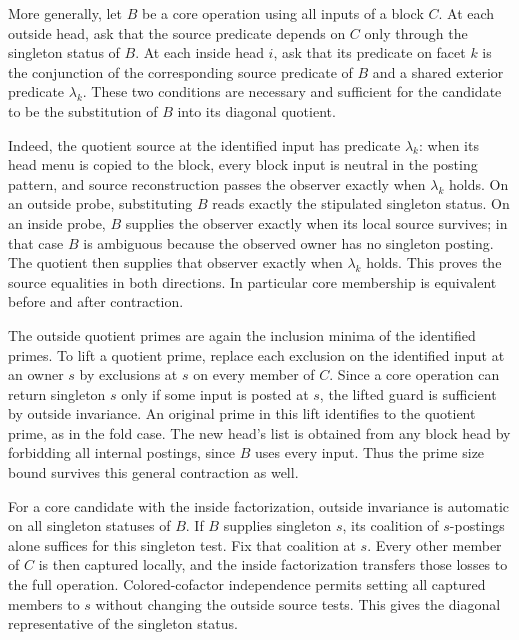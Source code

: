 More generally, let $B$ be a core operation using
all inputs of a block $C$. At each outside head, ask
that the source predicate depends on $C$ only through
the singleton status of $B$. At each inside head
$i$, ask that its predicate on facet $k$ is the
conjunction of the corresponding source predicate
of $B$ and a shared exterior predicate $\lambda_k$.
These two conditions are necessary and sufficient
for the candidate to be the substitution of $B$ into
its diagonal quotient.

Indeed, the quotient source at the identified input
has predicate $\lambda_k$: when its head menu is
copied to the block, every block input is neutral
in the posting pattern, and source reconstruction
passes the observer exactly when $\lambda_k$ holds.
On an outside probe, substituting $B$ reads exactly
the stipulated singleton status. On an inside probe,
$B$ supplies the observer exactly when its local
source survives; in that case $B$ is ambiguous
because the observed owner has no singleton
posting. The quotient then supplies that observer
exactly when $\lambda_k$ holds. This proves the
source equalities in both directions. In particular
core membership is equivalent before and after
contraction.

The outside quotient primes are again the inclusion
minima of the identified primes. To lift a quotient
prime, replace each exclusion on the identified input
at an owner $s$ by exclusions at $s$ on every member
of $C$. Since a core operation can return singleton
$s$ only if some input is posted at $s$, the lifted
guard is sufficient by outside invariance. An original
prime in this lift identifies to the quotient prime,
as in the fold case. The new head's list is obtained
from any block head by forbidding all internal
postings, since $B$ uses every input. Thus the prime
size bound survives this general contraction as well.

For a core candidate with the inside factorization,
outside invariance is automatic on all singleton
statuses of $B$. If $B$ supplies singleton $s$,
its coalition of $s$-postings alone suffices for
this singleton test. Fix that coalition at $s$.
Every other member of $C$ is then captured locally,
and the inside factorization transfers those
losses to the full operation. Colored-cofactor
independence permits setting all captured members
to $s$ without changing the outside source tests.
This gives the diagonal representative of the
singleton status.

